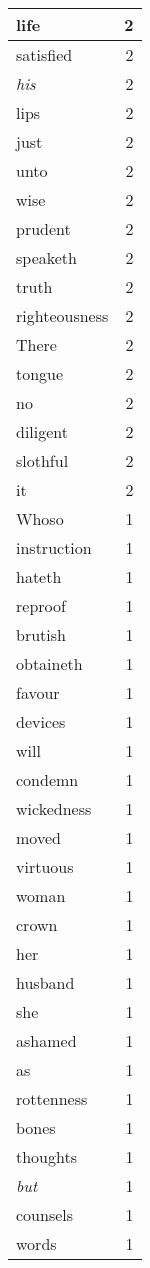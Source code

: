 \begin{center}
\begin{longtable}{l|r}
life & 2\\ \hline 
satisfied & 2\\ \hline 
\emph{his} & 2\\ \hline 
lips & 2\\ \hline 
just & 2\\ \hline 
unto & 2\\ \hline 
wise & 2\\ \hline 
prudent & 2\\ \hline 
speaketh & 2\\ \hline 
truth & 2\\ \hline 
righteousness & 2\\ \hline 
There & 2\\ \hline 
tongue & 2\\ \hline 
no & 2\\ \hline 
diligent & 2\\ \hline 
slothful & 2\\ \hline 
it & 2\\ \hline 
Whoso & 1\\ \hline 
instruction & 1\\ \hline 
hateth & 1\\ \hline 
reproof & 1\\ \hline 
brutish & 1\\ \hline 
obtaineth & 1\\ \hline 
favour & 1\\ \hline 
devices & 1\\ \hline 
will & 1\\ \hline 
condemn & 1\\ \hline 
wickedness & 1\\ \hline 
moved & 1\\ \hline 
virtuous & 1\\ \hline 
woman & 1\\ \hline 
crown & 1\\ \hline 
her & 1\\ \hline 
husband & 1\\ \hline 
she & 1\\ \hline 
ashamed & 1\\ \hline 
as & 1\\ \hline 
rottenness & 1\\ \hline 
bones & 1\\ \hline 
thoughts & 1\\ \hline 
\emph{but} & 1\\ \hline 
counsels & 1\\ \hline 
words & 1\\ \hline 

\end{longtable}
\end{center}
